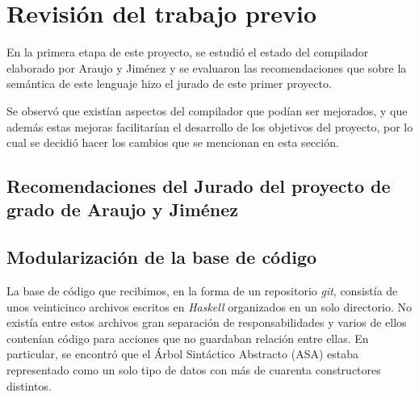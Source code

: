 \setcounter{section}{-1}
\section{Revisión del trabajo previo}

En la primera etapa de este proyecto, se estudió el estado del compilador
elaborado por Araujo y Jiménez y se evaluaron las recomendaciones que sobre la
semántica de este lenguaje hizo el jurado de este primer proyecto.

Se observó que existían aspectos del compilador que podían ser mejorados, y que
además estas mejoras facilitarían el desarrollo de los objetivos del proyecto,
por lo cual se decidió hacer los cambios que se mencionan en esta sección.


\subsection{Recomendaciones del Jurado del proyecto de grado de Araujo y Jiménez}

\subsection{Modularización de la base de código}

La base de código que recibimos, en la forma de un repositorio \emph{git},
consistía de unos veinticinco archivos escritos en \emph{Haskell} organizados en
un solo directorio. No existía entre estos archivos gran separación de
responsabilidades y varios de ellos contenían código para acciones que no
guardaban relación entre ellas. En particular, se encontró que el Árbol
Sintáctico Abstracto (\textsc{ASA}) estaba representado como un solo tipo de
datos con más de cuarenta constructores distintos.

